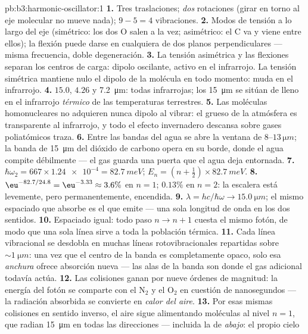 \begin{solution}{pb:b3:harmonic-oscillator:1}
\textbf{1.} Tres traslaciones; \emph{dos} rotaciones (girar en torno al eje
molecular no mueve nada); $9 - 5 = 4$ vibraciones.
\textbf{2.} Modos de tensión a lo largo del eje (simétrico: los dos O salen
a la vez; asimétrico: el C va y viene entre ellos); la flexión puede darse
en cualquiera de dos planos perpendiculares --- misma frecuencia, doble
degeneración.
\textbf{3.} La tensión asimétrica y las flexiones separan los centros de
carga: dipolo oscilante, activo en el infrarrojo. La tensión simétrica
mantiene nulo el dipolo de la molécula en todo momento: muda en el
infrarrojo.
\textbf{4.} $15.0$, $4.26$ y \qty{7.2}{\micro m}: todas infrarrojas;
los \qty{15}{\micro m} se sitúan de lleno en el infrarrojo \emph{térmico}
de las temperaturas terrestres.
\textbf{5.} Las moléculas homonucleares no adquieren nunca dipolo al
vibrar: el grueso de la atmósfera es transparente al infrarrojo, y todo el
efecto invernadero descansa sobre gases poliatómicos traza.
\textbf{6.} Entre las bandas del agua se abre la ventana de
$8$--$13\,\unit{\micro m}$; la banda de \qty{15}{\micro m} del dióxido de
carbono opera en su borde, donde el agua compite débilmente --- el gas
guarda una puerta que el agua deja entornada.
\textbf{7.} $\hbar\omega_2 = 667 \times \num{1.24e-4} =
\qty{82.7}{meV}$; $E_n = (n + \tfrac12) \times \qty{82.7}{meV}$.
\textbf{8.} $\eu^{-82.7/24.8} = \eu^{-3.33} \approx 3.6\%$ en $n =
1$; $0.13\%$ en $n = 2$: la escalera está levemente, pero permanentemente, encendida.
\textbf{9.} $\lambda = hc/\hbar\omega \to \qty{15.0}{\micro m}$; el
mismo espaciado que absorbe es el que emite --- una sola longitud de onda en
los dos sentidos.
\textbf{10.} Espaciado igual: todo paso $n \to n + 1$ cuesta el mismo
fotón, de modo que una sola línea sirve a toda la población térmica.
\textbf{11.} Cada línea vibracional se desdobla en muchas líneas
rotovibracionales repartidas sobre $\sim\qty{1}{\micro m}$:
una vez que el centro de la banda es completamente opaco, solo esa
\emph{anchura} ofrece absorción nueva --- las alas de la banda son donde el
gas adicional todavía actúa.
\textbf{12.} Las colisiones ganan por nueve órdenes de magnitud: la energía
del fotón se comparte con el N$_2$ y el O$_2$ en cuestión de nanosegundos
--- la radiación absorbida se convierte en \emph{calor del aire}.
\textbf{13.} Por esas mismas colisiones en sentido inverso, el aire sigue
alimentando moléculas al nivel $n = 1$, que radian \qty{15}{\micro m} en
todas las direcciones --- incluida la de \emph{abajo}: el propio cielo

\end{solution}
